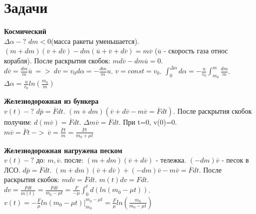 \documentclass{article}
\begin{document}
\section{Задачи}
\begin{minipage}{.3\textwidth}
\textbf{Космический}\\
$\Delta \alpha-?$ $dm<0$(масса ракеты уменьшается). $(m+dm)(\overline{v}+d\overline{v})-dm(\overline{u}+\overline{v}+d\overline{v})=m\overline{v}$ ($\overline{u}$ - скорость газа относ корабля). После раскрытия скобок: $md\overline{v}-dm\overline{u}=0$.
$d\overline{v}=\frac{dm}{m}\overline{u}\ =>\ dv = v_0d\alpha=-\frac{dm}{m}u$. $v = const = v_0$. $\int_{0}^{\Delta \alpha}d\alpha = -\frac{u}{v_0}\int_{m_0}^{m}\frac{dm}{m}$. 
$\Delta \alpha = \frac{u}{v_0}ln(\frac{m_0}{m})$
\end{minipage}
\hfill
\begin{minipage}{.3\textwidth}
\textbf{Железнодорожная из бункера}\\
$v(t)-?$ $d\overline{p} = \overline{F}dt$. $(m+dm)(\overline{v}+d\overline{v} - m\overline{v} = \overline{F}dt)$. После раскрытия скобок получим: 
$d(m\overline{v}) = \overline{F}dt$. $\Delta m\overline{v} = \overline{F}dt$. При t=0, v(0)=0. $m\overline{v} = \overline{F}t \ ->\ \overline{v} = \frac{\overline{F}t}{m} = \frac{\overline{F}t}{m_0+\mu t} $
\end{minipage}
\hfill
\begin{minipage}{.3\textwidth}
\textbf{Железнодорожная нагружена песком}\\
$v(t)-?$ до: $m,\overline{v}$. после: $(m+dm)(\overline{v}+d\overline{v})$ - тележка. $(-dm)\overline{v}$ - песок в ЛСО.
$d\overline{p} = \overline{F}dt$. $(m+dm)(\overline{v}+d\overline{v})+(-dm)\overline{v} - m\overline{v} = \overline{F}dt$. После раскрытия скобок: 
$md\overline{v} = \overline{F}dt$. $m(t)dv = F dt$. $dv = \frac{F dt}{m(t)} = \frac{F dt}{m_0 -\mu t} = \frac{F}{-\mu}\int_{0}^{t}d(ln(m_0-\mu t))$.
$v(t) = -\frac{F}{\mu}ln(m_0-\mu t)|^{m_0-\mu t}_{m_0}= \frac{F}{\mu}ln(\frac{m_0}{m_0-\mu t})$


\end{minipage}
\end{document}
